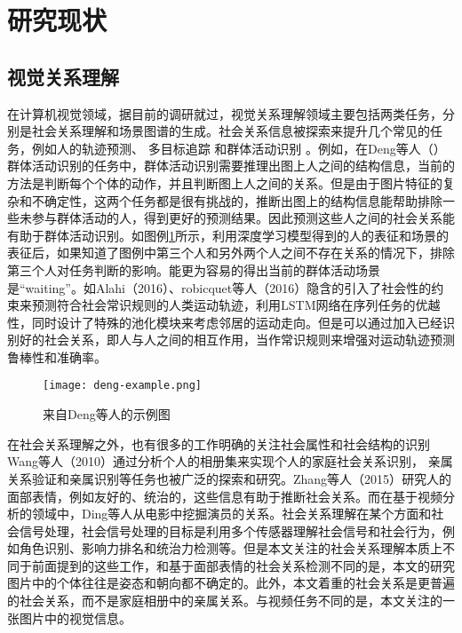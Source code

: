 \section{研究现状}

\subsection{视觉关系理解}
在计算机视觉领域，据目前的调研就过，视觉关系理解领域主要包括两类任务，分别是社会关系理解和场景图谱的生成。社会关系信息被探索来提升几个常见的任务，例如人的轨迹预测\cite{kim2015brvo,robicquet2016learning}、 多目标追踪\cite{chen2012discovering,qin2012improving} 和群体活动识别
\cite{direkoglu2012team,lan2012social,lan2012discriminative}。例如，在Deng等人（\cite{deng2016structure}）群体活动识别的任务中，群体活动识别需要推理出图上人之间的结构信息，当前的方法是判断每个个体的动作，并且判断图上人之间的关系。但是由于图片特征的复杂和不确定性，这两个任务都是很有挑战的，推断出图上的结构信息能帮助排除一些未参与群体活动的人，得到更好的预测结果。因此预测这些人之间的社会关系能有助于群体活动识别。如图例\ref{fig:deng-example}所示，利用深度学习模型得到的人的表征和场景的表征后，如果知道了图例中第三个人和另外两个人之间不存在关系的情况下，排除第三个人对任务判断的影响。能更为容易的得出当前的群体活动场景是``waiting''。如Alahi（2016）\cite{alahi2016social}、robicquet等人（2016）\cite{robicquet2016learning}隐含的引入了社会性的约束来预测符合社会常识规则的人类运动轨迹，利用LSTM网络在序列任务的优越性，同时设计了特殊的池化模块来考虑邻居的运动走向。但是可以通过加入已经识别好的社会关系，即人与人之间的相互作用，当作常识规则来增强对运动轨迹预测鲁棒性和准确率。
\begin{figure}[htpb]
	\centering
	\texttt{[image: deng-example.png]}
    \caption{来自Deng等人\cite{deng2016structure}的示例图}
	\vspace*{-3.5mm}
	\label{fig:deng-example}
\end{figure}

在社会关系理解之外，也有很多的工作明确的关注社会属性和社会结构的识别Wang等人（2010）\cite{wang2010seeing}通过分析个人的相册集来实现个人的家庭社会关系识别，
亲属关系验证\cite{dibeklioglu2013like,fang2010towards,xia2012understanding}和亲属识别\cite{chen2012discovering,guo2014graph}等任务也被广泛的探索和研究。Zhang等人（2015）\cite{zhang2015learning}研究人的面部表情，例如友好的、统治的，这些信息有助于推断社会关系。而在基于视频分析的领域中，Ding等人\cite{ding2014learning}从电影中挖掘演员的关系。社会关系理解在某个方面和社会信号处理\cite{vinciarelli2009social}，社会信号处理的目标是利用多个传感器理解社会信号和社会行为，例如角色识别、影响力排名和统治力检测等\cite{hung2007using,rienks2006detection,salamin2009automatic}。但是本文关注的社会关系理解本质上不同于前面提到的这些工作，和基于面部表情的社会关系检测不同的是，本文的研究图片中的个体往往是姿态和朝向都不确定的。此外，本文着重的社会关系是更普遍的社会关系，而不是家庭相册中的亲属关系。与视频任务不同的是，本文关注的一张图片中的视觉信息。

